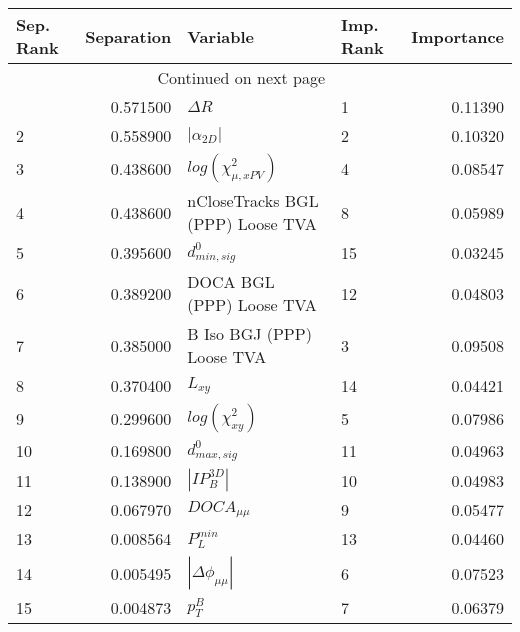 \usepackage{lscape}

\begin{landscape}
\begin{longtable}{lrllr}
\toprule
Sep. Rank &  Separation &                          Variable & Imp. Rank &  Importance \\
\midrule
\endhead
\midrule
\multicolumn{3}{r}{{Continued on next page}} \\
\midrule
\endfoot

\bottomrule
\endlastfoot
        1 &    0.571500 &                        $\Delta R$ &         1 &     0.11390 \\
        2 &    0.558900 &                   $|\alpha_{2D}|$ &         2 &     0.10320 \\
        3 &    0.438600 &         $log(\chi^{2}_{\mu,xPV})$ &         4 &     0.08547 \\
        4 &    0.438600 &  nCloseTracks BGL (PPP) Loose TVA &         8 &     0.05989 \\
        5 &    0.395600 &                  $d^0_{min, sig}$ &        15 &     0.03245 \\
        6 &    0.389200 &          DOCA BGL (PPP) Loose TVA &        12 &     0.04803 \\
        7 &    0.385000 &         B Iso BGJ (PPP) Loose TVA &         3 &     0.09508 \\
        8 &    0.370400 &                          $L_{xy}$ &        14 &     0.04421 \\
        9 &    0.299600 &              $log(\chi^{2}_{xy})$ &         5 &     0.07986 \\
       10 &    0.169800 &                  $d^0_{max, sig}$ &        11 &     0.04963 \\
       11 &    0.138900 &                   $|IP_{B}^{3D}|$ &        10 &     0.04983 \\
       12 &    0.067970 &                   $DOCA_{\mu\mu}$ &         9 &     0.05477 \\
       13 &    0.008564 &                     $P^{min}_{L}$ &        13 &     0.04460 \\
       14 &    0.005495 &          $|\Delta \phi_{\mu\mu}|$ &         6 &     0.07523 \\
       15 &    0.004873 &                         $p^B_{T}$ &         7 &     0.06379 \\
\end{longtable}

\end{landscape}
